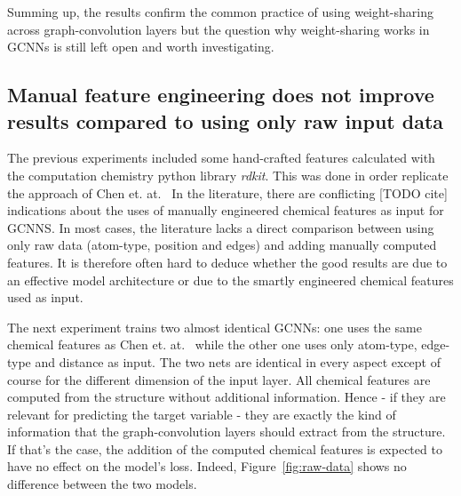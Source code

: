 Summing up, the results confirm the common practice of using weight-sharing across graph-convolution layers but the question why weight-sharing works in GCNNs is still left open and worth investigating.


\subsection{Manual feature engineering does not improve results compared to using only raw input data}
\label{sec:raw-data}

The previous experiments included some hand-crafted features calculated with the computation chemistry python library \textit{rdkit}. This was done in order replicate the approach of Chen et. at.~\cite{Chen2019} In the literature, there are conflicting [TODO cite] indications about the uses of manually engineered chemical features as input for GCNNS. In most cases, the literature lacks a direct comparison between using only raw data (atom-type, position and edges) and adding manually computed features. It is therefore often hard to deduce whether the good results are due to an effective model architecture or due to the smartly engineered chemical features used as input.

The next experiment trains two almost identical GCNNs: one uses the same chemical features as Chen et. at.~\cite{Chen2019} while the other one uses only atom-type, edge-type and distance as input. The two nets are identical in every aspect except of course for the different dimension of the input layer. All chemical features
are computed from the structure without additional information. Hence - if they are relevant for predicting the target variable - they are exactly the kind of information that the graph-convolution layers should extract from the structure. If that's the case, the addition of the computed chemical features is expected to have no effect on the model's loss. Indeed, Figure~\ref{fig:raw-data} shows no difference between the two models.

